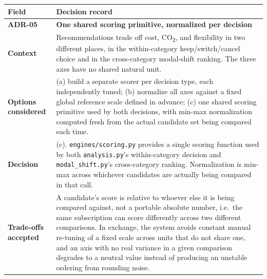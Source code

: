 \documentclass[
  11pt,
  a4paper,
  DIV=11,
  numbers=noendperiod,
  notitlepage]{scrreprt}
\newcounter{none} %
\begin{document}
{\def\LTcaptype{none} %
\begin{longtable}[]{@{}
  >{\raggedright\arraybackslash}p{}
  >{\raggedright\arraybackslash}p{}@{}}
\toprule\noalign{}
\begin{minipage}[b]{\linewidth}\raggedright
Field
\end{minipage} & \begin{minipage}[b]{\linewidth}\raggedright
Decision record
\end{minipage} \\
\midrule\noalign{}
\endhead
\bottomrule\noalign{}
\endlastfoot
\textbf{ADR-05} & \textbf{One shared scoring primitive, normalized per
decision} \\
\textbf{Context} & Recommendations trade off cost, CO\textsubscript{2},
and flexibility in two different places, in the within-category
keep/switch/cancel choice and in the cross-category modal-shift ranking.
The three axes have no shared natural unit. \\
\textbf{Options considered} & (a) build a separate scorer per decision
type, each independently tuned; (b) normalize all axes against a fixed
global reference scale defined in advance; (c) one shared scoring
primitive used by both decisions, with min-max normalization computed
fresh from the actual candidate set being compared each time. \\
\textbf{Decision} & (c). \texttt{engines/scoring.py} provides a single
scoring function used by both \texttt{analysis.py}'s within-category
decision and \texttt{modal\_shift.py}'s cross-category ranking.
Normalization is min-max across whichever candidates are actually being
compared in that call. \\
\textbf{Trade-offs accepted} & A candidate's score is relative to
whoever else it is being compared against, not a portable absolute
number, i.e.~the same subscription can score differently across two
different comparisons. In exchange, the system avoids constant manual
re-tuning of a fixed scale across units that do not share one, and an
axis with no real variance in a given comparison degrades to a neutral
value instead of producing an unstable ordering from rounding noise. \\
\end{longtable}
}
\end{document}
